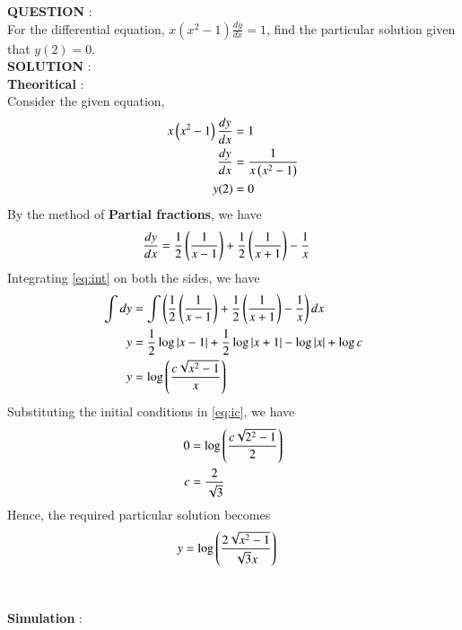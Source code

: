 \documentclass[journal]{IEEEtran}
\begin{document}
\textbf{QUESTION} : \\
For the differential equation, $x (x^2 - 1) \frac{dy}{dx} = 1$, find the particular solution given that $y(2) = 0$. \\
\textbf{SOLUTION} : \\
\textbf{Theoritical} : \\
Consider the given equation, 
\begin{align}
	x \left(x^2 - 1\right) \frac{dy}{dx} &= 1 \\
	\frac{dy}{dx} &= \frac{1}{x \left(x^2 -1\right)} \label{eq:de} \\
	y(2) &= 0 \label{eq:ic}
\end{align}
By the method of \textbf{Partial fractions}, we have \\
\begin{align}
	\frac{dy}{dx} &= \frac{1}{2} \left(\frac{1}{x-1}\right) + \frac{1}{2} \left(\frac{1}{x+1}\right) - \frac{1}{x} \label{eq:int}
\end{align}
Integrating \eqref{eq:int} on both the sides, we have
\begin{align}
	\int dy &= \int \left(\frac{1}{2} \left(\frac{1}{x-1}\right) + \frac{1}{2} \left(\frac{1}{x+1}\right) - \frac{1}{x}\right) dx \\
	y &= \frac{1}{2} \log{\left\vert x-1\right\vert} + \frac{1}{2} \log{\left\vert x+1\right\vert} - \log{\left\vert x\right\vert} + \log{c} \\
	y &= \log \left(\frac{c\sqrt{x^2 - 1}}{x}\right)
\end{align}
Substituting the initial conditions in \eqref{eq:ic}, we have
\begin{align}
	0 &= \log \left(\frac{c\sqrt{2^2 - 1}}{2}\right) \\
	c &= \frac{2}{\sqrt{3}}
\end{align}
Hence, the required particular solution becomes
\begin{align}
	y &= \log \left(\frac{2\sqrt{x^2 - 1}}{\sqrt{3} x}\right) 
\end{align}
\\ \\
\textbf{Simulation} : 
\end{document}
